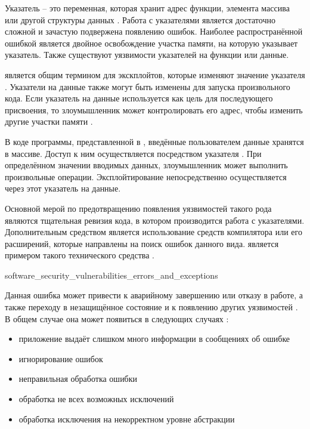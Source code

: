 

%
Указатель -- это переменная, которая хранит адрес функции, элемента массива или другой структуры 
данных . 
%
Работа с указателями является достаточно сложной и зачастую подвержена появлению ошибок. 
%
Наиболее распространённой ошибкой является двойное освобождение участка памяти, на которую 
указывает указатель. 
%
Также существуют уязвимости указателей на функции или данные.

%
 является общим термином для экскплойтов, которые 
изменяют значение указателя . 
%
Указатели на данные также могут быть изменены для запуска произвольного кода. 
%
Если указатель на данные используется как цель для последующего присвоения, то злоумышленник может 
контролировать его адрес, чтобы изменить другие участки памяти . 

%
В коде программы, представленной в 
, введённые пользователем 
данные хранятся в массиве.
%
Доступ к ним осуществляется посредством указателя . 
%
При определённом значении вводимых данных, злоумышленник может выполнить произвольные операции. 
%
Эксплойтирование непосредственно осуществляется через этот указатель на данные.

%
Основной мерой по предотвращению появления уязвимостей такого рода являются тщательная ревизия кода, 
в котором производится работа с указателями. 
%
Дополнительным средством является использование средств компилятора или его расширений, которые 
направлены на поиск ошибок данного вида. 
%
 является примером такого технического средства . 


	{software_security_vulnerabilities_errors_and_exceptions}

%
Данная ошибка может привести к аварийному завершению или отказу  в работе, 
а также переходу в незащищённое состояние и к появлению других уязвимостей . 
%
В общем случае она может появиться в следующих случаях :
\begin{itemize}
	\item приложение выдаёт слишком много информации в сообщениях об ошибке 
	\item игнорирование ошибок 
	\item неправильная обработка ошибки 
	\item обработка не всех возможных исключений 
	\item обработка исключения на некорректном уровне абстракции 
\end{itemize}

